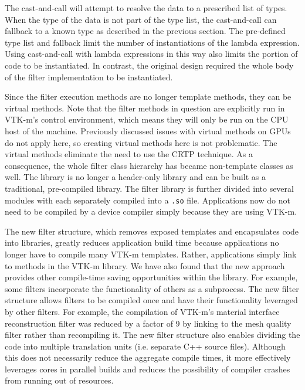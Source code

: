 The cast-and-call will attempt to resolve the data to a prescribed list of types.
When the type of the data is not part of the type list, the cast-and-call can fallback to a known type as described in the previous  section.
The pre-defined type list and fallback limit the number of instantiations of the lambda expression.
Using cast-and-call with lambda expressions in this way also limits the portion of code to be instantiated.
In contrast, the original design required the whole body of the filter implementation to be instantiated.

Since the filter execution methods are no longer template methods, they can be virtual methods.
Note that the filter methods in question are explicitly run in VTK-m's control environment, which means they will only be run on the CPU host of the machine.
Previously discussed issues with virtual methods on GPUs do not apply here, so creating virtual methods here is not problematic.
The virtual methods eliminate the need to use the CRTP technique.
As a consequence, the whole filter class hierarchy has became non-template classes as well.
The library is no longer a header-only library and can be built as a traditional, pre-compiled library.
The filter library is further divided into several modules with each separately compiled into a \texttt{.so} file.
Applications now do not need to be compiled by a device compiler simply because they are using VTK-m.

The new filter structure, which removes exposed templates and encapsulates code into libraries, greatly reduces application build time because applications no longer have to compile many VTK-m templates.
Rather, applications simply link to methods in the VTK-m library.
We have also found that the new approach provides other compile-time saving opportunities within the library.
For example, some filters incorporate the functionality of others as a subprocess.
The new filter structure allows filters to be compiled once and have their functionality leveraged by other filters.
For example, the compilation of VTK-m's material interface reconstruction filter was reduced by a factor of 9 by linking to the mesh quality filter rather than recompiling it.
The new filter structure also enables dividing the code into multiple translation units (i.e. separate C++ source files).
Although this does not necessarily reduce the aggregate compile times, it more effectively leverages cores in parallel builds and reduces the possibility of compiler crashes from running out of resources.

